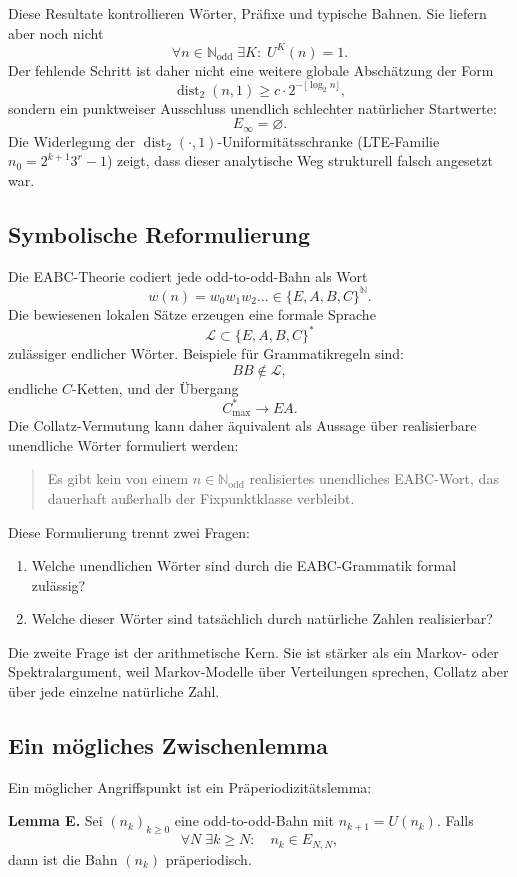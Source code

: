 \documentclass[12pt,a4paper]{article}
\newcommand{\N}{\mathbb{N}}
\newcommand{\Nodd}{\mathbb{N}_{\mathrm{odd}}}
\newcommand{\disttwo}{\operatorname{dist}_2}
\newcommand{\Einf}{E_{\infty}}
\begin{document}
Diese Resultate kontrollieren Wörter, Präfixe und typische Bahnen. Sie liefern aber noch nicht
\[
\forall n\in\Nodd\;\exists K:\;U^K(n)=1.
\]
Der fehlende Schritt ist daher nicht eine weitere globale Abschätzung der Form
\[
\disttwo(n,1)\geq c\cdot 2^{-\lfloor\log_2 n\rfloor},
\]
sondern ein punktweiser Ausschluss unendlich schlechter natürlicher Startwerte:
\[
\Einf=\varnothing.
\]
Die Widerlegung der $\disttwo(\cdot,1)$-Uniformitätsschranke (LTE-Familie $n_0=2^{k+1}3^r-1$) zeigt, dass dieser analytische Weg strukturell falsch angesetzt war.

\subsection{Symbolische Reformulierung}

Die EABC-Theorie codiert jede odd-to-odd-Bahn als Wort
\[
w(n)=w_0w_1w_2\ldots
\in\{E,A,B,C\}^{\N}.
\]
Die bewiesenen lokalen Sätze erzeugen eine formale Sprache
\[
\mathcal{L}\subset\{E,A,B,C\}^{\ast}
\]
zulässiger endlicher Wörter. Beispiele für Grammatikregeln sind:
\[
BB\notin\mathcal{L},
\]
endliche $C$-Ketten,
und der Übergang
\[
C^\ast_{\max}\longrightarrow EA.
\]
Die Collatz-Vermutung kann daher äquivalent als Aussage über realisierbare unendliche Wörter formuliert werden:
\begin{quote}
Es gibt kein von einem $n\in\Nodd$ realisiertes unendliches EABC-Wort, das dauerhaft außerhalb der Fixpunktklasse verbleibt.
\end{quote}
Diese Formulierung trennt zwei Fragen:
\begin{enumerate}
\item Welche unendlichen Wörter sind durch die EABC-Grammatik formal zulässig?
\item Welche dieser Wörter sind tatsächlich durch natürliche Zahlen realisierbar?
\end{enumerate}
Die zweite Frage ist der arithmetische Kern. Sie ist stärker als ein Markov- oder Spektralargument, weil Markov-Modelle über Verteilungen sprechen, Collatz aber über jede einzelne natürliche Zahl.

\subsection{Ein mögliches Zwischenlemma}

Ein möglicher Angriffspunkt ist ein Präperiodizitätslemma:

\medskip
\noindent\textbf{Lemma E.}
Sei $(n_k)_{k\geq 0}$ eine odd-to-odd-Bahn mit $n_{k+1}=U(n_k)$.
Falls
\[
\forall N\;\exists k\geq N:\quad n_k\in E_{N,N},
\]
dann ist die Bahn $(n_k)$ präperiodisch.
\medskip
\end{document}
